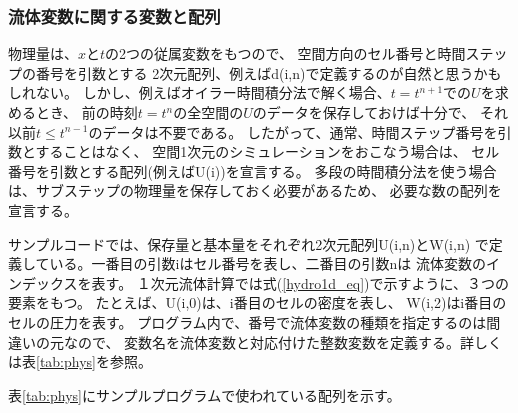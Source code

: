 {%
\subsubsection{流体変数に関する変数と配列}
物理量は、$x$と$t$の2つの従属変数をもつので、
空間方向のセル番号と時間ステップの番号を引数とする
2次元配列、例えば{\ttfamily d(i,n)}で定義するのが自然と思うかもしれない。
しかし、例えばオイラー時間積分法で解く場合、$t=t^{n+1}$での$U$を求めるとき、
前の時刻$t=t^n$の全空間の$U$のデータを保存しておけば十分で、
それ以前$t\le t^{n-1}$のデータは不要である。
したがって、通常、時間ステップ番号を引数とすることはなく、
空間1次元のシミュレーションをおこなう場合は、
セル番号を引数とする配列(例えば{\ttfamily U(i)})を宣言する。
多段の時間積分法を使う場合は、サブステップの物理量を保存しておく必要があるため、
必要な数の配列を宣言する。

\vspace{1cm}

サンプルコードでは、保存量と基本量をそれぞれ2次元配列{\ttfamily U(i,n)}と{\ttfamily W(i,n)}
で定義している。一番目の引数{\ttfamily i}はセル番号を表し、二番目の引数{\ttfamily n}は
流体変数のインデックスを表す。
１次元流体計算では式(\ref{hydro1d_eq})で示すように、３つの要素をもつ。
たとえば、{\ttfamily U(i,0)}は、i番目のセルの密度を表し、
{\ttfamily W(i,2)}はi番目のセルの圧力を表す。
プログラム内で、番号で流体変数の種類を指定するのは間違いの元なので、
変数名を流体変数と対応付けた整数変数を定義する。詳しくは表\ref{tab:phys}を参照。




表\ref{tab:phys}にサンプルプログラムで使われている配列を示す。




}
